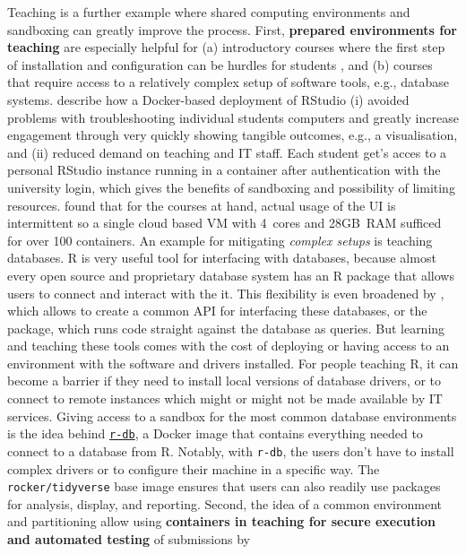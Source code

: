 Teaching is a further example where shared computing environments and
sandboxing can greatly improve the process. First, \textbf{prepared
environments for teaching} are especially helpful for (a) introductory
courses where the first step of installation and configuration can be
hurdles for students \citep{cetinkaya-rundel_infrastructure_2018}, and
(b) courses that require access to a relatively complex setup of
software tools, e.g., database systems.
\citet{cetinkaya-rundel_infrastructure_2018} describe how a Docker-based
deployment of RStudio (i) avoided problems with troubleshooting
individual students computers and greatly increase engagement through
very quickly showing tangible outcomes, e.g., a visualisation, and (ii)
reduced demand on teaching and IT staff. Each student get's acces to a
personal RStudio instance running in a container after authentication
with the university login, which gives the benefits of sandboxing and
possibility of limiting resources.
\citet{cetinkaya-rundel_infrastructure_2018} found that for the courses
at hand, actual usage of the UI is intermittent so a single cloud based
VM with 4~cores and 28GB~RAM sufficed for over 100 containers. An
example for mitigating \emph{complex setups} is teaching databases. R is
very useful tool for interfacing with databases, because almost every
open source and proprietary database system has an R package that allows
users to connect and interact with the it. This flexibility is even
broadened by , which allows to create a common API for
interfacing these databases, or the  package, which runs
 code straight against the database as queries. But
learning and teaching these tools comes with the cost of deploying or
having access to an environment with the software and drivers installed.
For people teaching R, it can become a barrier if they need to install
local versions of database drivers, or to connect to remote instances
which might or might not be made available by IT services. Giving access
to a sandbox for the most common database environments is the idea
behind \href{https://github.com/ColinFay/r-db}{\texttt{r-db}}, a Docker
image that contains everything needed to connect to a database from R.
Notably, with \texttt{r-db}, the users don't have to install complex
drivers or to configure their machine in a specific way. The
\texttt{rocker/tidyverse} base image ensures that users can also readily
use packages for analysis, display, and reporting. Second, the idea of a
common environment and partitioning allow using \textbf{containers in
teaching for secure execution and automated testing} of submissions by
